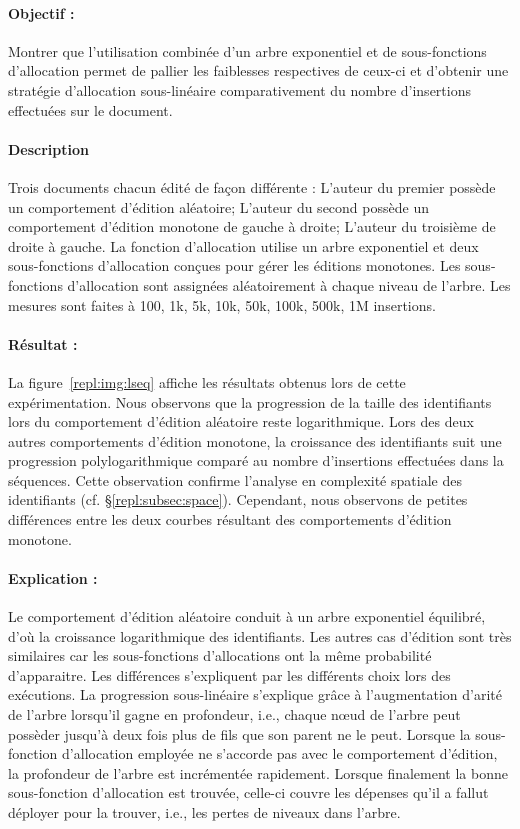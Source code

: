 \paragraph{Objectif :} Montrer que l'utilisation combinée d'un arbre exponentiel
et de sous-fonctions d'allocation permet de pallier les faiblesses respectives
de ceux-ci et d'obtenir une stratégie d'allocation sous-linéaire comparativement
du nombre d'insertions effectuées sur le document. 

\paragraph{Description} Trois documents chacun édité de façon différente :
L'auteur du premier possède un comportement d'édition aléatoire; L'auteur du
second possède un comportement d'édition monotone de gauche à droite; L'auteur
du troisième de droite à gauche. La fonction d'allocation utilise un arbre
exponentiel et deux sous-fonctions d'allocation conçues pour gérer les éditions
monotones. Les sous-fonctions d'allocation sont assignées aléatoirement à chaque
niveau de l'arbre. Les mesures sont faites à 100, 1k, 5k, 10k, 50k, 100k, 500k,
1M insertions.

\paragraph{Résultat :} La figure~\ref{repl:img:lseq} affiche les résultats
obtenus lors de cette expérimentation. Nous observons que la progression de la
taille des identifiants lors du comportement d'édition aléatoire reste
logarithmique. Lors des deux autres comportements d'édition monotone, la
croissance des identifiants suit une progression polylogarithmique comparé au
nombre d'insertions effectuées dans la séquences. Cette observation confirme
l'analyse en complexité spatiale des identifiants
(cf. §\ref{repl:subsec:space}). Cependant, nous observons de petites
différences entre les deux courbes résultant des comportements d'édition monotone.

\paragraph{Explication :} Le comportement d'édition aléatoire conduit à un arbre
exponentiel équilibré, d'où la croissance logarithmique des identifiants. Les
autres cas d'édition sont très similaires car les sous-fonctions d'allocations
ont la même probabilité d'apparaitre. Les différences s'expliquent par les
différents choix lors des exécutions. La progression sous-linéaire s'explique
grâce à l'augmentation d'arité de l'arbre lorsqu'il gagne en profondeur, i.e.,
chaque nœud de l'arbre peut possèder jusqu'à deux fois plus de fils que son
parent ne le peut. Lorsque la sous-fonction d'allocation employée ne s'accorde
pas avec le comportement d'édition, la profondeur de l'arbre est incrémentée
rapidement. Lorsque finalement la bonne sous-fonction d'allocation est trouvée,
celle-ci couvre les dépenses qu'il a fallut déployer pour la trouver, i.e.,
les pertes de niveaux dans l'arbre.

